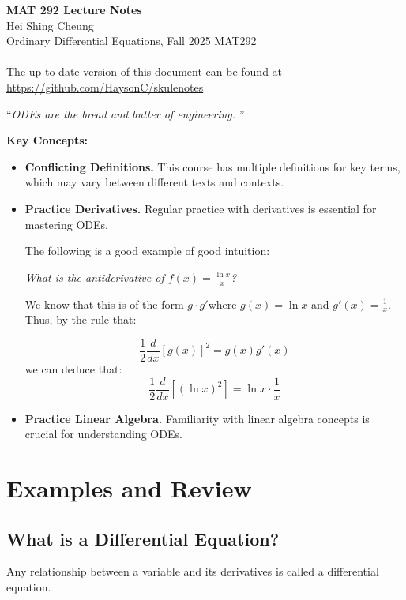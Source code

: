 \documentclass[11pt]{article}
\begin{document}
\thispagestyle{empty}
{\LARGE \bf MAT 292 Lecture Notes}\\
{\large Hei Shing Cheung}\\
Ordinary Differential Equations, Fall 2025 \hfill MAT292\\
\\
The up-to-date version of this document can be found at \url{https://github.com/HaysonC/skulenotes}\\

\begin{center}
    ``\textit{ODEs are the bread and butter of engineering. }''
\end{center}
\begin{shaded}
    \textbf{Key Concepts:}
    \begin{itemize}
        \item \textbf{Conflicting Definitions. } This course has multiple definitions for key terms, which may vary between different texts and contexts.
        \item \textbf{Practice Derivatives. } Regular practice with derivatives is essential for mastering ODEs.
        \begin{example}
            The following is a good example of good intuition:

            \textit{What is the antiderivative of $f(x) = \frac{\ln x}{x}$?}

            We know that this is of the form $g \cdot g'$where $g(x) = \ln x$ and $g'(x) = \frac{1}{x}$. Thus, by the rule that:

            \begin{equation}
            \frac{1}{2} \frac{d}{dx} [g(x)]^2 = g(x) g'(x)
            \end{equation}
            we can deduce that:
            $$
            \frac{1}{2} \frac{d}{dx} [(\ln x)^2] = \ln x \cdot \frac{1}{x}
            $$
        \end{example}
        \item \textbf{Practice Linear Algebra. } Familiarity with linear algebra concepts is crucial for understanding ODEs.
    \end{itemize}
\end{shaded}
\section{Examples and Review}
\subsection{What is a Differential Equation?}
\begin{definition}
     Any relationship between a variable and its derivatives is called a differential equation. 
\end{definition}
\end{document}
